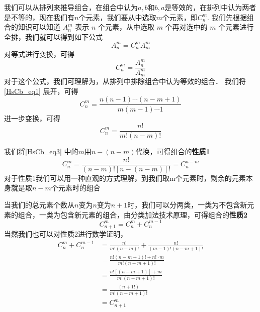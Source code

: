 
我们可以从排列来推导组合，在组合中认为${a,b}$和${b,a}$是等效的，在排列中认为两者是不等的，现在我们有$n$个元素，我们要从中选取$m$个元素，即$C_n^m$.
我们先根据组合的知识可以知道 $A_n^m$ 表示 $n$ 个元素，从中选取 $m$ 个再对选中的 $m$ 个元素进行全排，我们就可以得到如下公式
\begin{equation}
A_n^m = C_n^m A_m^m
\end{equation}
对等式进行变换，可得
\begin{equation}\label{HsCb_eq1}
 C_n^m = \frac {A_n^m}{A_m^m}
\end{equation}
对于这个公式，我们可理解为，从排列中排除组合中认为等效的组合．
我们将\autoref{HsCb_eq1} 展开，可得
\begin{equation}\label{HsCb_eq2} 
C_n^m = \frac{n(n -1) \cdots(n -m + 1)}{m(m-1)\cdots 1}
\end{equation}
进一步变换，可得
\begin{equation}\label{HsCb_eq3}
C_n^m = \frac{n!}{m!(n-m)!}
\end{equation}

我们将\autoref{HsCb_eq3} 中的$m$用$n-(n-m) $代换，可得组合的\textbf{性质1}
\begin{equation}
C_n^m = \frac{n!}{(n -m)![n-(n-m)]!} = C_n^{n-m}
\end{equation}
对于性质1我们可以用一种直观的方式理解，到我们取m个元素时，剩余的元素本身就是取$n-m$个元素时的组合

当我们的总元素个数从$n$变为$n$变为$n+1$时，我们可以分两类，一类为不包含新元素的组合，一类为包含新元素的组合，由分类加法技术原理，可得组合的\textbf{性质2}
\begin{equation}
C_{n + 1}^m = C_n^m + C_n^{m -1}
\end{equation}
当然我们也可以对性质2进行数学证明，
\begin{equation}
\begin{aligned}
C_n^m + C_n^{m - 1} &= \frac{n!}{m!(n-m)!} + \frac{n!}{(m - 1)!(n - m + 1)!}\\
&= \frac{n!(n - m + 1)! + n!\cdot m}{m!(n - m + 1)!}\\
&= \frac{n![(n - m + 1)] + m}{m!(n - m + 1)!}\\
&= \frac{(n + 1!)}{m!(n - m + 1)!}\\
&= C_{n + 1}^m
\end{aligned}
\end{equation}
